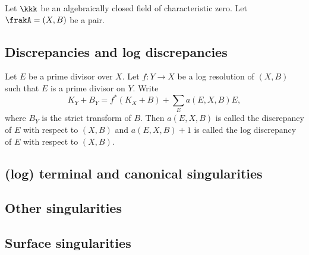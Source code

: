 Let $\kkk$ be an algebraically closed field of characteristic zero.
  Let $\frakA = (X,B)$ be a pair.

\subsection{Discrepancies and log discrepancies}

  \begin{definition}
    Let $E$ be a prime divisor over $X$.
    Let $f: Y \to X$ be a log resolution of $(X,B)$ such that $E$ is a prime divisor on $Y$.
    Write
    \[ K_Y + B_Y = f^*(K_X + B) + \sum_E a(E,X,B) E, \]
    where $B_Y$ is the strict transform of $B$.
    Then $a(E,X,B)$ is called the discrepancy of $E$ with respect to $(X,B)$ and $a(E,X,B) + 1$ is called the log discrepancy of $E$ with respect to $(X,B)$.
    \Yang{}
  \end{definition}



\subsection{(log) terminal and canonical singularities}



\subsection{Other singularities}



\subsection{Surface singularities}
